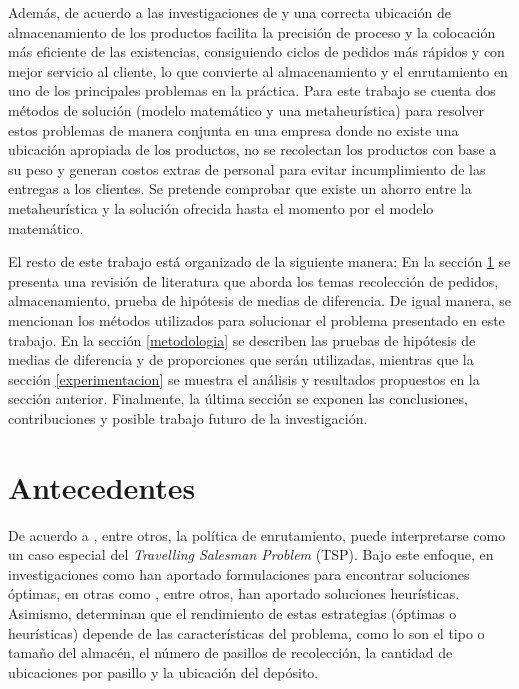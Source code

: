 \documentclass[preprint,12pt, pdftex]{elsarticle}
\begin{document}
Además, de acuerdo a las investigaciones de \citet{Brynzer1996} y \citet{Manzini2012} una correcta ubicación de almacenamiento de los productos facilita la precisión de proceso y la colocación más eficiente de las existencias, consiguiendo ciclos de pedidos más rápidos y con mejor servicio al cliente, lo que convierte al almacenamiento y el enrutamiento en uno de los principales problemas en la práctica. Para este trabajo se cuenta dos métodos de solución (modelo matemático y una metaheurística) para resolver estos problemas de manera conjunta en una empresa donde no existe una ubicación apropiada de los productos, no se recolectan los productos con base a su peso y generan costos extras de personal para evitar incumplimiento de las entregas a los clientes. Se pretende comprobar que existe un ahorro entre la metaheurística y la solución ofrecida hasta el momento por el modelo matemático.

El resto de este trabajo está organizado de la siguiente manera: En la sección \ref{antecedentes} se presenta una revisión de literatura que aborda los temas recolección de pedidos, almacenamiento, prueba de hipótesis de medias de diferencia. De igual manera, se mencionan los métodos utilizados para solucionar el problema presentado en este trabajo. En la sección \ref{metodologia} se describen las pruebas de hipótesis de medias de diferencia y de proporciones que serán utilizadas, mientras que la sección \ref{experimentacion} se muestra el análisis y resultados propuestos en la sección anterior. Finalmente, la última sección se exponen las conclusiones, contribuciones y posible trabajo futuro de la investigación.

\section{Antecedentes} \label{antecedentes}

De acuerdo a \citet{Daniels1998, Lin2016, Scholz2016, Theys2010}, entre otros, la política de enrutamiento, puede interpretarse como un caso especial del \textit{Travelling Salesman Problem} (TSP). Bajo este enfoque, en investigaciones como \citet{Petersen1999, Ratliff1983, Roodbergen2001, Scholz2016, Bolanos2020} han aportado formulaciones para encontrar soluciones óptimas, en otras como \citet{Daniels1998, Dekker2004, DeKoster1998, Theys2010, Vaughan1999, Zulj2018}, entre otros, han aportado soluciones heurísticas. Asimismo, \citet{Roodbergen2001, Scholz2016, Vaughan1999} determinan que el rendimiento de estas estrategias (óptimas o heurísticas) depende de las características del problema, como lo son el tipo o tamaño del almacén, el número de pasillos de recolección, la cantidad de ubicaciones por pasillo y la ubicación del depósito.
\end{document}

